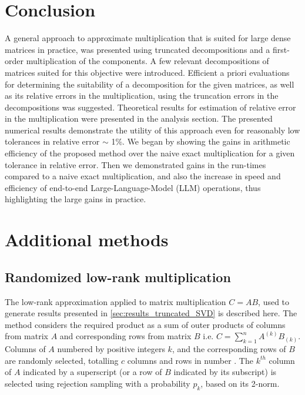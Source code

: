 \documentclass[onefignum,onetabnum]{siamart171218}
\begin{document}
\section{Conclusion}
A general approach to approximate multiplication that is suited for large dense matrices in practice, was presented using truncated decompositions and a first-order multiplication of the components. A few relevant decompositions of matrices suited for this objective were introduced. Efficient a priori evaluations for determining the suitability of a decomposition for the given matrices, as well as its relative errors in the multiplication, using the truncation errors in the decompositions was suggested. Theoretical results for estimation of relative error in the multiplication were presented in the analysis section. The presented numerical results demonstrate the utility of this approach even for reasonably low tolerances in relative error $\sim$ 1\%. We began by showing the gains in arithmetic efficiency of the proposed method over the naive exact multiplication for a given tolerance in relative error. Then we demonstrated gains in the run-times compared to a naive exact multiplication, and also the increase in speed and efficiency of end-to-end Large-Language-Model (LLM) operations, thus highlighting the large gains in practice.

\vspace{3mm}

\appendix

\section{Additional methods}

\subsection{Randomized low-rank multiplication}\label{sec:low_rank_algorithm}
The low-rank approximation applied to matrix multiplication $C=AB$, used to generate results presented in \cref{sec:results_truncated_SVD} is described here. The method considers the required product as a sum of outer products of columns from matrix $A$ and corresponding rows from matrix $B$ i.e. $C = \sum_{k = 1}^{n} A^{(k)} B_{(k)}$. Columns of $A$ numbered by positive integers $k$, and the corresponding rows of $B$ are randomly selected, totalling $c$ columns and rows in number \cite{matrixmultiply2006Kannan}. The $k^{th}$ column of $A$ indicated by a superscript (or a row of $B$ indicated by its subscript) is selected using rejection sampling with a probability $p_k$, based on its 2-norm.
\end{document}
